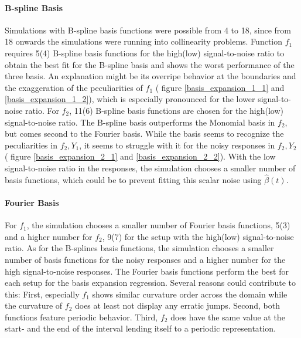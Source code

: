 \documentclass[11pt,twoside,a4paper]{article}
\begin{document}
	\paragraph{B-spline Basis}
	Simulations with B-spline basis functions were possible from 4 to 18, since from 18 onwards the simulations were running into collinearity problems.
	Function $f_1$ requires 5(4) B-spline basis functions for the high(low) signal-to-noise ratio to obtain the best fit for the B-spline basis and shows the worst performance of the three basis. An explanation might be its overripe behavior at the boundaries and the exaggeration of the peculiarities of $f_1$ ( figure \ref{basis_expansion_1_1} and \ref{basis_expansion_1_2}), which is especially pronounced for the lower signal-to-noise ratio. For $f_2$, 11(6) B-spline basis functions are chosen for the high(low) signal-to-noise ratio. The B-spline basis outperforms the Monomial basis in $f_2$, but comes second to the Fourier basis. While the basis seems to recognize the peculiarities in $f_2,Y_1$, it seems to struggle with it for the noisy responses in $f_2,Y_2$ ( figure \ref{basis_expansion_2_1} and \ref{basis_expansion_2_2}). With the low signal-to-noise ratio in the responses, the simulation chooses a smaller number of basis functions, which could be to prevent fitting this scalar noise using $\hat{\beta}(t)$.
	\vspace{-0.2cm}
	
	\paragraph{Fourier Basis}
	For $f_1$, the simulation chooses a smaller number of Fourier basis functions, 5(3) and a higher number for $f_2$, 9(7) for the setup with the high(low) signal-to-noise ratio. As for the B-splines basis functions, the simulation chooses a smaller number of basis functions for the noisy responses and a higher number for the high signal-to-noise responses. The Fourier basis functions perform the best for each setup for the basis expansion regression. Several reasons could contribute to this: First, especially $f_1$ shows similar curvature order across the domain while the curvature of $f_2$ does at least not display any erratic jumps. Second, both functions feature periodic behavior. Third, $f_2$ does have the same value at the start- and the end of the interval lending itself to a periodic representation.	\\
	
\end{document}

